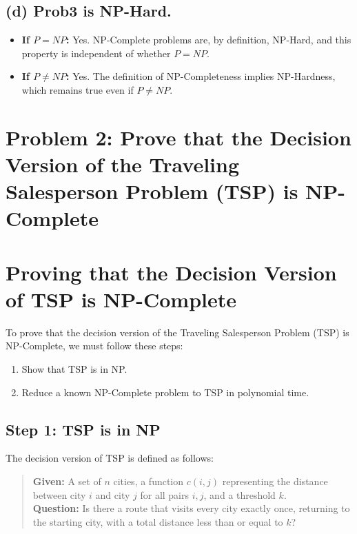\documentclass[12pt]{article}
\begin{document}
\subsection*{(d) Prob3 is NP-Hard.}
\begin{itemize}
    \item \textbf{If \(P = NP\):} Yes. NP-Complete problems are, by definition, NP-Hard, and this property is independent of whether \(P = NP\).
    \item \textbf{If \(P \neq NP\):} Yes. The definition of NP-Completeness implies NP-Hardness, which remains true even if \(P \neq NP\).
\end{itemize}

\section*{Problem 2: Prove that the Decision Version of the Traveling Salesperson Problem (TSP) is NP-Complete}

\section*{Proving that the Decision Version of TSP is NP-Complete}

To prove that the decision version of the Traveling Salesperson Problem (TSP) is NP-Complete, we must follow these steps:

\begin{enumerate}
    \item Show that TSP is in NP.
    \item Reduce a known NP-Complete problem to TSP in polynomial time.
\end{enumerate}

\subsection*{Step 1: TSP is in NP}

The decision version of TSP is defined as follows:

\begin{quote}
\textbf{Given:} A set of \(n\) cities, a function \(c(i, j)\) representing the distance between city \(i\) and city \(j\) for all pairs \(i, j\), and a threshold \(k\).\\
\textbf{Question:} Is there a route that visits every city exactly once, returning to the starting city, with a total distance less than or equal to \(k\)?
\end{quote}
\end{document}

